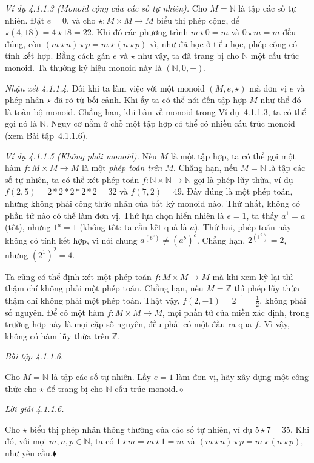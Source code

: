 \noindent\textit{Ví dụ 4.1.1.3 (Monoid cộng của các số tự nhiên).} Cho $M=\mathbb{N}$ là tập các số tự nhiên. Đặt $e=0$, và cho $\star:M\times M\to M$ biểu thị phép cộng, để $\star(4,18)=4\star18=22$. Khi đó các phương trình $m\star0=m$ và $0\star m=m$ đều đúng, còn $(m\star n)\star p=m\star(n\star p)$ vì, như đã học ở tiểu học, phép cộng có tính kết hợp. Bằng cách gán $e$ và $\star$ như vậy, ta đã trang bị cho $\mathbb{N}$ một cấu trúc monoid. Ta thường ký hiệu monoid này là $(\mathbb{N},0,+)$.

\noindent\textit{Nhận xét 4.1.1.4.} Đôi khi ta làm việc với một monoid $(M,e,\star)$ mà đơn vị $e$ và phép nhân $\star$ đã rõ từ bối cảnh. Khi ấy ta có thể nói đến tập hợp $M$ như thể đó là toàn bộ monoid. Chẳng hạn, khi bàn về monoid trong Ví dụ~4.1.1.3, ta có thể gọi nó là $\mathbb{N}$. Nguy cơ nằm ở chỗ một tập hợp có thể có nhiều cấu trúc monoid (xem Bài tập~4.1.1.6).

\noindent\textit{Ví dụ 4.1.1.5 (Không phải monoid).} Nếu $M$ là một tập hợp, ta có thể gọi một hàm $f:M\times M\to M$ là một \emph{phép toán trên $M$}. Chẳng hạn, nếu $M=\mathbb{N}$ là tập các số tự nhiên, ta có thể xét phép toán $f:\mathbb{N}\times\mathbb{N}\to\mathbb{N}$ gọi là phép lũy thừa, ví dụ $f(2,5)=2*2*2*2*2=32$ và $f(7,2)=49$. Đây đúng là một phép toán, nhưng không phải công thức nhân của bất kỳ monoid nào. Thứ nhất, không có phần tử nào có thể làm đơn vị. Thử lựa chọn hiển nhiên là $e=1$, ta thấy $a^1=a$ (tốt), nhưng $1^a=1$ (không tốt: ta cần kết quả là $a$). Thứ hai, phép toán này không có tính kết hợp, vì nói chung $a^{(b^c)}\ne(a^b)^c$. Chẳng hạn, $2^{(1^2)}=2$, nhưng $(2^1)^2=4$.

Ta cũng có thể định xét một phép toán $f:M\times M\to M$ mà khi xem kỹ lại thì thậm chí không phải một phép toán. Chẳng hạn, nếu $M=\mathbb{Z}$ thì phép lũy thừa thậm chí không phải một phép toán. Thật vậy, $f(2,-1)=2^{-1}=\tfrac12$, không phải số nguyên. Để có một hàm $f:M\times M\to M$, mọi phần tử của miền xác định, trong trường hợp này là mọi cặp số nguyên, đều phải có một đầu ra qua $f$. Vì vậy, không có hàm lũy thừa trên $\mathbb{Z}$.

\noindent\textit{Bài tập 4.1.1.6.}\keepwithnext

Cho $M=\mathbb{N}$ là tập các số tự nhiên. Lấy $e=1$ làm đơn vị, hãy xây dựng một công thức cho $\star$ để trang bị cho $\mathbb{N}$ cấu trúc monoid.\hfill$\diamond$

\noindent\textit{Lời giải 4.1.1.6.}\keepwithnext

Cho $\star$ biểu thị phép nhân thông thường của các số tự nhiên, ví dụ $5\star7=35$. Khi đó, với mọi $m,n,p\in\mathbb{N}$, ta có $1\star m=m\star1=m$ và $(m\star n)\star p=m\star(n\star p)$, như yêu cầu.\hfill$\blacklozenge$

